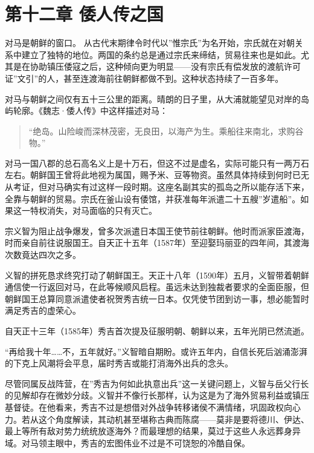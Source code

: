 \documentclass[
]{book}
\begin{document}
\chapter*{第十二章 倭人传之国}\label{ux7b2cux5341ux4e8cux7ae0-ux502dux4ebaux4f20ux4e4bux56fd}

对马是朝鲜的窗口。
从古代末期律令时代以''惟宗氏''为名开始，宗氏就在对朝关系中建立了独特的地位。两国的条约总是通过宗氏来缔结，贸易往来也是如此。尤其是在协助镇压倭寇之后，这种倾向更为明显------没有宗氏有偿发放的渡航许可证''文引''的人，甚至连渡海前往朝鲜都做不到。这种状态持续了一百多年。

对马与朝鲜之间仅有五十三公里的距离。晴朗的日子里，从大浦就能望见对岸的岛屿轮廓。《魏志·倭人传》中这样描述对马：

\begin{quote}
``绝岛。山险峻而深林茂密，无良田，以海产为生。乘船往来南北，求购谷物。''
\end{quote}

对马一国八郡的总石高名义上是十万石，但这不过是虚名，实际可能只有一两万石左右。朝鲜国王曾将此地视为属国，赐予米、豆等物资。虽然具体持续到何时已无从考证，但对马确实有过这样一段时期。这座名副其实的孤岛之所以能存活下来，全靠与朝鲜的贸易。宗氏在釜山设有倭馆，并获准每年派遣二十五艘''岁遣船''。如果这一特权消失，对马面临的只有灭亡。

宗义智为阻止战争爆发，曾多次派遣日本国王使节前往朝鲜。他时而派家臣渡海，时而亲自前往说服国王。自天正十五年（1587年）至迎娶玛丽亚的四年间，其渡海次数竟达四次之多。

义智的拼死恳求终究打动了朝鲜国王。天正十八年（1590年）五月，义智带着朝鲜通信使一行返回对马，在此等候顺风启程。虽远未达到独裁者要求的全面臣服，但朝鲜国王总算同意派遣使者祝贺秀吉统一日本。仅凭使节团到访一事，想必能暂时满足秀吉的虚荣心。

自天正十三年（1585年）秀吉首次提及征服明朝、朝鲜以来，五年光阴已然流逝。

``再给我十年\ldots\ldots 不，五年就好。''义智暗自期盼。或许五年内，自信长死后汹涌澎湃的下克上风潮将会平息，届时秀吉或能打消海外出兵的念头。

尽管同属反战阵营，在''秀吉为何如此执意出兵''这一关键问题上，义智与岳父行长的见解却存在微妙分歧。义智并不像行长那样，认为这是为了海外贸易利益或镇压基督徒。在他看来，秀吉不过是想借对外战争转移诸侯不满情绪，巩固政权向心力。若从这个角度解读，其动机甚至堪称古典而陈腐------莫非是要将德川、伊达、最上等所有敌对势力统统放逐海外？而最理想的结果，莫过于这些人永远葬身异域。对马领主眼中，秀吉的宏图伟业不过是不可饶恕的冷酷自保。
\end{document}
